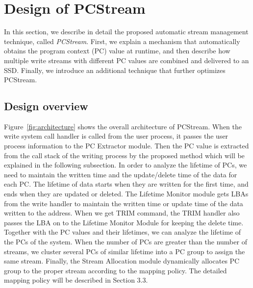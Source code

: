 \section{Design of PCStream}
In this section, we describe in detail the proposed automatic stream management
technique, called \textit{PCStream}.  First, we explain a mechanism that
automatically obtains the program context (PC) value at runtime, and then
describe how multiple write streams with different PC values are combined and
delivered to an SSD. Finally, we introduce an additional technique that further
optimizes PCStream.

\subsection{Design overview}
Figure~\ref{fig:architecture} shows the overall architecture of PCStream.  When
the write system call handler is called from the user process, it passes the
user process information to the PC Extractor module.  Then the PC value is
extracted from the call stack of the writing process by the proposed method
which will be explained in the following subsection.  In order to analyze the
lifetime of PCs, we need to maintain the written time and the update/delete
time of the data for each PC.  The lifetime of data starts when they are
written for the first time, and ends when they are updated or deleted.  The
Lifetime Monitor module gets LBAs from the write handler to maintain the
written time or update time of the data written to the address.  When we get
TRIM command, the TRIM handler also passes the LBA on to the Lifetime Monitor
Module for keeping the delete time.  Together with the PC values and their
lifetimes, we can analyze the lifetime of the PCs of the system.  When the
number of PCs are greater than the number of streams, we cluster several PCs of
similar lifetime into a PC group to assign the same stream.  Finally, the
Stream Allocation module dynamically allocates PC group to the proper stream
according to the mapping policy.  The detailed mapping policy will be described
in Section 3.3.

